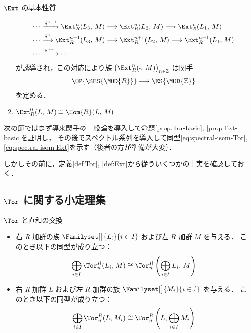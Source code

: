\documentclass[algtopo_main]{subfiles}
\begin{document}
\begin{myprop}[label=prop:Ext-basic, breakable]{$\Ext$ の基本性質}
\begin{enumerate}
        \begin{align}
            \cdots &\xrightarrow{\delta^{n-1}} \Ext^n_R(L_3,\, M) \lto \Ext^n_R(L_2,\, M) \lto \Ext^n_R(L_1,\, M) \\
            \cdots &\xrightarrow{\delta^{n}} \Ext^{n+1}_R(L_3,\, M) \lto \Ext^{n+1}_R(L_2,\, M) \lto \Ext^{n+1}_R(L_1,\, M) \\
            \cdots &\xrightarrow{\delta^{n+1}} \cdots
        \end{align}
        が誘導され，この対応により族 $\bigl( \Ext^n_R(\text{-},\, M) \bigr)_{n \in \mathbb{Z}}$ は関手
        \begin{align}
            \OP{\SES{\MOD{R}}} \lto \ES{\MOD{\mathbb{Z}}}
        \end{align}
        を定める．
        \item $\Ext_R^0 (L,\, M) \cong \Hom{R}(L ,\, M)$
    \end{enumerate}
\end{myprop}

次の節ではまず導来関手の一般論を導入して命題\ref{prop:Tor-basic}, \ref{prop:Ext-basic}を証明し，
その後でスペクトル系列を導入して同型\eqref{eq:spectral-isom-Tor}, \eqref{eq:spectral-isom-Ext}を示す（後者の方が準備が大変）．

しかしその前に，定義\ref{def:Tor}, \ref{def:Ext}から従ういくつかの事実を確認しておく．

\subsection{$\Tor$ に関する小定理集}

\begin{myprop}[]{$\Tor$ と直和の交換}
    \begin{itemize}
        \item 右 $R$ 加群の族 $\Familyset[\big]{L_i}{i \in I}$ および左 $R$ 加群 $M$ を与える．
        このとき以下の同型が成り立つ：
        \begin{align}
            \label{isom:Tor2ds-L}
            \bigoplus_{i \in I} \Tor^R_n (L_i,\, M) \cong \Tor^R_n \left( \bigoplus_{i \in I}L_i,\, M \right)  
        \end{align}
        \item 右 $R$ 加群 $L$ および左 $R$ 加群の族 $\Familyset[\big]{M_i}{i \in I}$ を与える．
        このとき以下の同型が成り立つ：
        \begin{align}
            \label{isom:Tor2ds-R}
            \bigoplus_{i \in I} \Tor^R_n (L,\, M_i) \cong \Tor^R_n \left(L,\, \bigoplus_{i \in I}M_i \right)  
        \end{align}
        
    \end{itemize}
    
\end{myprop}
\end{document}
